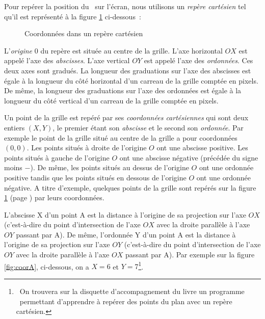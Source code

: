 Pour repérer la position du \robot\ sur l'écran, nous utilisons un {\em repère cartésien}
tel qu'il est représenté à la figure \ref{fig:repcar} ci-dessous~:

\begin{figure}[htbp]
 \caption{Coordonnées dans un repère cartésien}\label{fig:repcar}
\end{figure}

L'{\em origine\/} $0$ du repère est située au centre de la grille. L'axe horizontal $OX$ est 
appelé l'axe des {\em abscisses\/}. L'axe vertical $OY$ est 
appelé l'axe des {\em ordonnées\/}. Ces deux axes sont gradués. La longueur des
graduations sur l'axe des abscisses est égale à la longueur du côté horizontal d'un carreau 
 de la grille comptée en pixels. De même, la longueur des
graduations sur l'axe des ordonnées est égale à la longueur du côté vertical d'un carreau
de la grille comptée en pixels. 

Un point de la grille est repéré par ses {\em  coordonnées cartésiennes} qui sont
deux entiers $(X, Y)$, le premier étant son {\em abscisse} et le second son {\em ordonnée}. Par exemple le 
point de la grille situé au centre de la grille a pour coordonnées $(0, 0)$. Les points situés
à droite de l'origine $O$ ont une abscisse positive. Les points situés
à gauche de l'origine $O$ ont une abscisse négative (précédée du signe moins $-$). 
De même, les points situés au dessus
de l'origine $O$ ont une ordonnée positive tandis que les points situés
en dessous de l'origine $O$ ont une ordonnée négative.  A titre d'exemple, quelques points de 
la grille sont repérés sur la figure \ref{fig:repcar}  (page \pageref{fig:repcar}) par leurs 
coordonnées.  

L'abscisse X d'un point A est la distance à l'origine de sa projection sur l'axe $OX$
(c'est-à-dire du point d'intersection
de l'axe $OX$ avec la droite parallèle à l'axe $OY$ passant par A). De même, l'ordonnée Y d'un point 
A est la distance à l'origine de sa projection sur l'axe $OY$
(c'est-à-dire du point d'intersection
de l'axe $OY$ avec la droite parallèle à l'axe $OX$ passant par A). Par exemple sur la figure
\ref{fig:coorA}, 
ci-dessous,
on a $X = 6$ et $Y = 7$\footnote{\ On trouvera sur la disquette d'accompagnement du livre un programme
\pascal\ permettant d'apprendre à repérer des points du plan avec
un repère cartésien.}.

